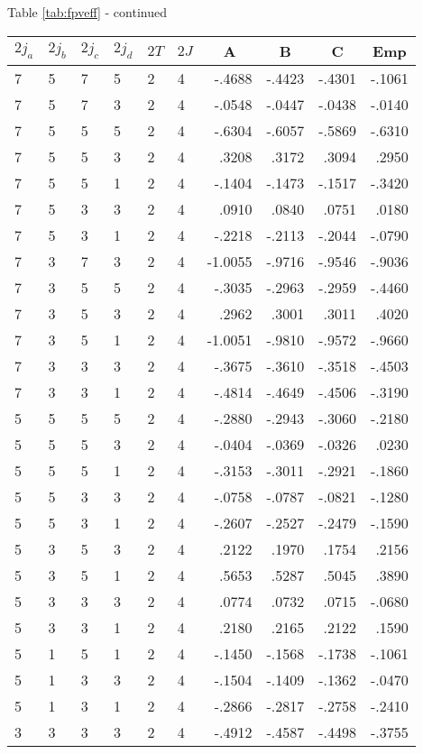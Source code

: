 \begin{center}{Table \ref{tab:fpveff} - continued}\end{center}
\clearpage
\small
\begin{center}
\begin{tabular}{llllllrrrr}
\hline
$2j_{a}$&$2j_{b}$&$2j_{c}$&$2j_{d}$&$2T$&$2J$&
\multicolumn{1}{c}{A}&
\multicolumn{1}{c}{B}&
\multicolumn{1}{c}{C}&
\multicolumn{1}{c}{Emp}
\\\hline
  7& 5& 7& 5& 2& 4&  -.4688&  -.4423&  -.4301&  -.1061\\
  7& 5& 7& 3& 2& 4&  -.0548&  -.0447&  -.0438&  -.0140\\
  7& 5& 5& 5& 2& 4&  -.6304&  -.6057&  -.5869&  -.6310\\
  7& 5& 5& 3& 2& 4&   .3208&   .3172&   .3094&   .2950\\
  7& 5& 5& 1& 2& 4&  -.1404&  -.1473&  -.1517&  -.3420\\
  7& 5& 3& 3& 2& 4&   .0910&   .0840&   .0751&   .0180\\
  7& 5& 3& 1& 2& 4&  -.2218&  -.2113&  -.2044&  -.0790\\
  7& 3& 7& 3& 2& 4& -1.0055&  -.9716&  -.9546&  -.9036\\
  7& 3& 5& 5& 2& 4&  -.3035&  -.2963&  -.2959&  -.4460\\
  7& 3& 5& 3& 2& 4&   .2962&   .3001&   .3011&   .4020\\
  7& 3& 5& 1& 2& 4& -1.0051&  -.9810&  -.9572&  -.9660\\
  7& 3& 3& 3& 2& 4&  -.3675&  -.3610&  -.3518&  -.4503\\
  7& 3& 3& 1& 2& 4&  -.4814&  -.4649&  -.4506&  -.3190\\
  5& 5& 5& 5& 2& 4&  -.2880&  -.2943&  -.3060&  -.2180\\
  5& 5& 5& 3& 2& 4&  -.0404&  -.0369&  -.0326&   .0230\\
  5& 5& 5& 1& 2& 4&  -.3153&  -.3011&  -.2921&  -.1860\\
  5& 5& 3& 3& 2& 4&  -.0758&  -.0787&  -.0821&  -.1280\\
  5& 5& 3& 1& 2& 4&  -.2607&  -.2527&  -.2479&  -.1590\\
  5& 3& 5& 3& 2& 4&   .2122&   .1970&   .1754&   .2156\\
  5& 3& 5& 1& 2& 4&   .5653&   .5287&   .5045&   .3890\\
  5& 3& 3& 3& 2& 4&   .0774&   .0732&   .0715&  -.0680\\
  5& 3& 3& 1& 2& 4&   .2180&   .2165&   .2122&   .1590\\
  5& 1& 5& 1& 2& 4&  -.1450&  -.1568&  -.1738&  -.1061\\
  5& 1& 3& 3& 2& 4&  -.1504&  -.1409&  -.1362&  -.0470\\
  5& 1& 3& 1& 2& 4&  -.2866&  -.2817&  -.2758&  -.2410\\
  3& 3& 3& 3& 2& 4&  -.4912&  -.4587&  -.4498&  -.3755\\
\hline
\end{tabular}
\end{center}
